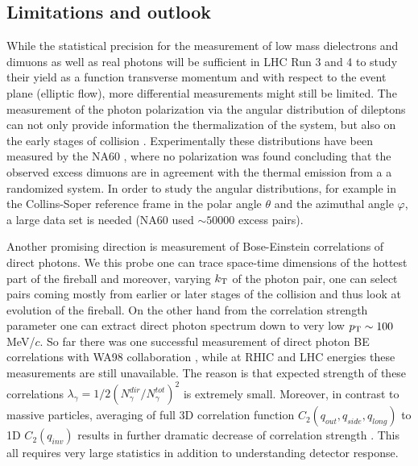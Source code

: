 \documentclass[../report.tex]{subfiles}
\begin{document}

\subsection{Limitations and outlook}

While the statistical precision for the measurement of low mass dielectrons and dimuons as well as real photons will be sufficient in LHC Run 3 and 4 to study their yield as a function transverse momentum and with respect to the event plane (elliptic flow), more differential measurements might still be limited. 
The measurement of the photon polarization via the angular distribution of dileptons can not only provide information the thermalization of the system, but also on the early stages of collision \cite{Baym:2017qxy}. Experimentally these distributions have been measured by the NA60 \cite{Arnaldi:2008gp}, where no polarization was found concluding that the observed excess dimuons are in agreement with the thermal emission from a a randomized system. In order to study the angular distributions, for example in the Collins-Soper reference frame \cite{Collins:1977iv,Lam:1978pu,Lam:1980uc} in the polar angle $\theta$ and the azimuthal angle $\varphi$, a large data set is needed (NA60 used $\sim50000$ excess \PGmpGmm pairs).

Another promising direction is measurement of Bose-Einstein correlations of direct photons. We this probe one can trace space-time dimensions of the hottest part of the fireball and moreover, varying $k_{\rm T}$ of the photon pair, one can select pairs coming mostly from earlier or later stages of the collision and thus look at evolution of the fireball. On the other hand from the correlation strength parameter one can extract direct photon spectrum down to very low $p_{\rm T} \sim 100$ MeV/$c$. So far there was one successful measurement of direct photon BE correlations with WA98 collaboration \cite{Aggarwal:2003zy}, while at RHIC and LHC energies these measurements are still unavailable. The reason is that expected strength of these correlations $\lambda_\gamma = 1/2(N_\gamma^{dir}/N_{\gamma}^{tot})^2$ is extremely small. Moreover, in contrast to massive particles, averaging of full 3D correlation function $C_2(q_{out},q_{side},q_{long})$ to 1D $C_2(q_{inv})$ results in further dramatic decrease of correlation strength \cite{Aggarwal:2003zy}. This all requires very large statistics in addition to understanding detector response. 
\end{document}
